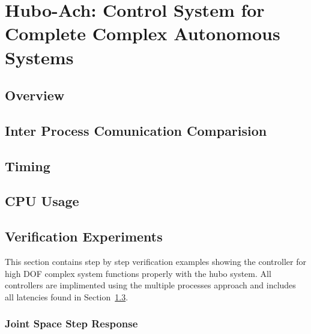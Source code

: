 \chapter{Hubo-Ach: Control System for Complete Complex Autonomous Systems}\label{sec:hubo-ach}

\section{Overview}




\section{Inter Process Comunication Comparision}\label{sec:ipc}
	
\section{Timing}\label{sec:timing}
	
\section{CPU Usage}
	
\section{Verification Experiments}\label{sec:simpleExamples}
This section contains step by step verification examples showing the controller for high DOF complex system functions properly with the hubo system.
All controllers are implimented using the multiple processes approach and includes all latencies found in Section~\ref{sec:timing}.

	\subsection{Joint Space Step Response}\label{sec:singlejointStep}
		
